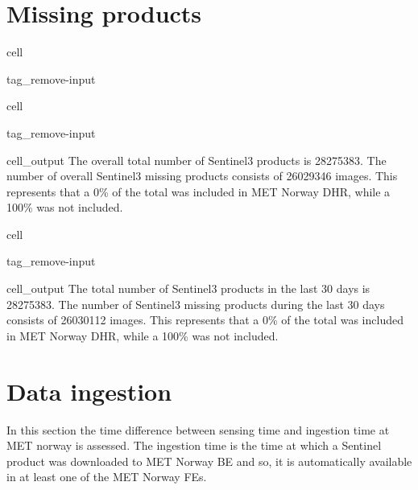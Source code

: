 \documentclass[letterpaper,10pt,english]{jupyterBook}
\begin{document}
\section{Missing products}
\label{\detokenize{S3_portals:missing-products}}
\begin{sphinxuseclass}{cell}
\begin{sphinxuseclass}{tag_remove-input}
\end{sphinxuseclass}
\end{sphinxuseclass}
\begin{sphinxuseclass}{cell}
\begin{sphinxuseclass}{tag_remove-input}\begin{sphinxVerbatimOutput}

\begin{sphinxuseclass}{cell_output}
\sphinxAtStartPar
The overall total number of Sentinel\sphinxhyphen{}3 products is 28275383. The number of overall Sentinel\sphinxhyphen{}3 missing products consists of 26029346 images. This represents that a 0\% of the total was included in MET Norway DHR, while a 100\% was not included.

\end{sphinxuseclass}\end{sphinxVerbatimOutput}

\end{sphinxuseclass}
\end{sphinxuseclass}
\begin{sphinxuseclass}{cell}
\begin{sphinxuseclass}{tag_remove-input}\begin{sphinxVerbatimOutput}

\begin{sphinxuseclass}{cell_output}
\sphinxAtStartPar
The total number of Sentinel\sphinxhyphen{}3 products in the last 30 days is 28275383. The number of Sentinel\sphinxhyphen{}3 missing products during the last 30 days consists of 26030112 images. This represents that a 0\% of the total was included in MET Norway DHR, while a 100\% was not included.

\end{sphinxuseclass}\end{sphinxVerbatimOutput}

\end{sphinxuseclass}
\end{sphinxuseclass}

\section{Data ingestion}
\label{\detokenize{S3_portals:data-ingestion}}
\sphinxAtStartPar
In this section the time difference between sensing time and ingestion time at MET norway is assessed. The ingestion time is the time at which a Sentinel product was downloaded to MET Norway BE and so, it is automatically available in at least one of the MET Norway FEs.
\end{document}
